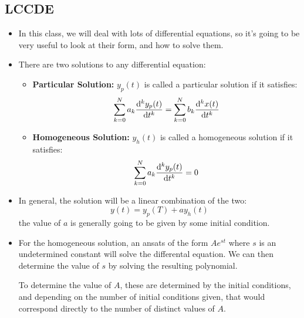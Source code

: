 \subsection{LCCDE} 
\begin{itemize}
	\item In this class, we will deal with lots of differential equations, so it's going to be very useful to 
		look at their form, and how to solve them.   
	\item There are two solutions to any differential equation: 
		\begin{itemize}
			\item \textbf{Particular Solution:} \( y_p(t) \) is called a particular solution if it satisfies:
				\[
					\sum_{k = 0}^{N}a_k \dv[k]{y_p(t)}{t} = \sum_{k = 0}^{N}b_k \dv[k]{x(t)}{t}
				\] 
			\item \textbf{Homogeneous Solution:} \( y_h(t) \) is called a homogeneous solution if it satisfies:  
				\[
						\sum_{k = 0}^{N}a_k \dv[k]{y_p(t)}{t} =	0
				\] 
		\end{itemize}
	\item In general, the solution will be a linear combination of the two: 
		\[
		y(t) = y_p(T) + ay_h(t)
		\] 
		the value of \( a \) is generally going to be given by some initial condition. 
	\item For the homogeneous solution, an ansats of the form \( Ae^{st} \) where \( s \) is an undetermined constant 
		will solve the differental equation. We can then determine the value of \( s \) by solving the resulting 
		polynomial.

		To determine the value of \( A \), these are determined by the initial conditions, and depending on the 
		number of initial conditions given, that would correspond directly to the number of distinct values of \( A \). 
\end{itemize}
